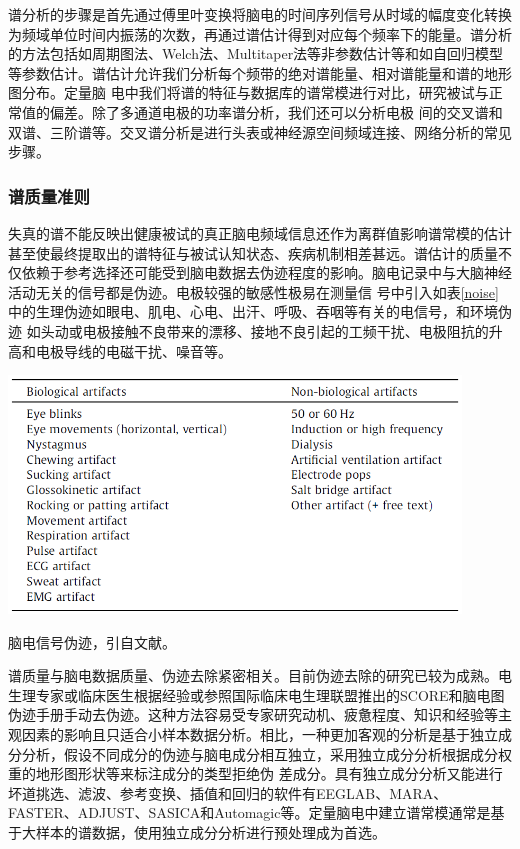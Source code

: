 谱分析的步骤是首先通过傅里叶变换将脑电的时间序列信号从时域的幅度变化转换为频域单位时间内振荡的次数，再通过谱估计得到对应每个频率下的能量。谱分析的方法包括如周期图法、Welch法、Multitaper法等非参数估计等和如自回归模型等参数估计。谱估计允许我们分析每个频带的绝对谱能量、相对谱能量和谱的地形图分布。定量脑
电中我们将谱的特征与数据库的谱常模进行对比，研究被试与正常值的偏差。除了多通道电极的功率谱分析，我们还可以分析电极
间的交叉谱和双谱、三阶谱等。交叉谱分析是进行头表或神经源空间频域连接、网络分析的常见步骤。

\subsubsection{谱质量准则}
失真的谱不能反映出健康被试的真正脑电频域信息还作为离群值影响谱常模的估计甚至使最终提取出的谱特征与被试认知状态、疾病机制相差甚远。谱估计的质量不仅依赖于参考选择还可能受到脑电数据去伪迹程度的影响。脑电记录中与大脑神经活动无关的信号都是伪迹。电极较强的敏感性极易在测量信
号中引入如表\ref{noise}中的生理伪迹如眼电、肌电、心电、出汗、呼吸、吞咽等有关的电信号，和环境伪迹
如头动或电极接触不良带来的漂移、接地不良引起的工频干扰、电极阻抗的升高和电极导线的电磁干扰、噪音等。
\begin{table}[!h]
	\includegraphics[width=12cm]{pic/xulun/EEGnoise.png}
	\caption{脑电信号伪迹，引自文献。}
	\label{noise}
\end{table}

谱质量与脑电数据质量、伪迹去除紧密相关。目前伪迹去除的研究已较为成熟。电生理专家或临床医生根据经验或参照国际临床电生理联盟推出的SCORE和脑电图伪迹手册手动去伪迹。这种方法容易受专家研究动机、疲惫程度、知识和经验等主观因素的影响且只适合小样本数据分析。相比，一种更加客观的分析是基于独立成分分析，假设不同成分的伪迹与脑电成分相互独立，采用独立成分分析根据成分权重的地形图形状等来标注成分的类型拒绝伪
差成分。具有独立成分分析又能进行坏道挑选、滤波、参考变换、插值和回归的软件有EEGLAB、MARA、FASTER、ADJUST、SASICA和Automagic等。定量脑电中建立谱常模通常是基于大样本的谱数据，使用独立成分分析进行预处理成为首选。

